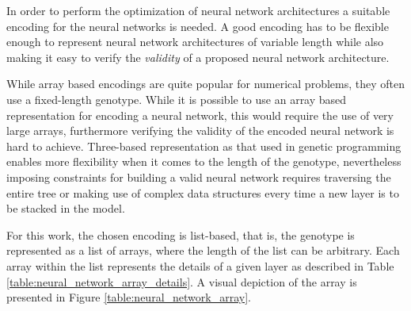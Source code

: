 \documentclass{article}
\begin{document}
In order to perform the optimization of neural network architectures a suitable encoding for the neural networks is needed. A good encoding has to be flexible enough to represent neural network architectures of variable length while also making it easy to verify the \textit{validity} of a proposed neural network architecture. 

While array based encodings are quite popular for numerical problems, they often use a fixed-length genotype. While it is possible to use an array based representation for encoding a neural network, this would require the use of very large arrays, furthermore verifying the validity of the encoded neural network is hard to achieve. Three-based representation as that used in genetic programming enables more flexibility when it comes to the length of the genotype, nevertheless imposing constraints for building a valid neural network requires traversing the entire tree or making use of complex data structures every time a new layer is to be stacked in the model. 

For this work, the chosen encoding is list-based, that is, the genotype is represented as a list of arrays, where the length of the list can be arbitrary. Each array within the list represents the details of a given layer as described in Table \ref{table:neural_network_array_details}. A visual depiction of the array is presented in Figure \ref{table:neural_network_array}.

\begin{table}[!htb]
\begin{center}
\end{center}
\caption{Details of the representation of a neural network layer as an array.}
\label{table:neural_network_array_details}
\end{table}
\end{document}
